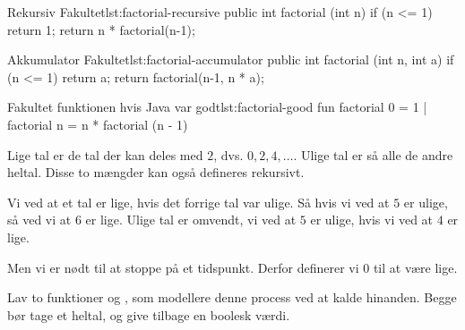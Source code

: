 

	\begin{JavaCode}{Rekursiv Fakultet}{lst:factorial-recursive}
		public int factorial (int n) {
			if (n <= 1)  return 1;
			return n * factorial(n-1);
		}
	\end{JavaCode}

	\begin{JavaCode}{Akkumulator Fakultet}{lst:factorial-accumulator}
		public int factorial (int n, int a) {
			if (n <= 1)  return a;
			return factorial(n-1, n * a);
		}
	\end{JavaCode}

	\begin{JavaCode}{Fakultet funktionen hvis Java var godt}{lst:factorial-good}
		fun factorial 0  =  1
		  | factorial n  =  n * factorial (n - 1)
	\end{JavaCode}

	\begin{exercise}
		Lige tal er de tal der kan deles med \(2\), dvs. \(0, 2, 4, \dots\).
		Ulige tal er så alle de andre heltal. Disse to mængder kan også defineres
		rekursivt.

		Vi ved at et tal er lige, hvis det forrige tal var ulige. Så hvis vi ved
		at \(5\) er ulige, så ved vi at \(6\) er lige. Ulige tal er omvendt, vi
		ved at \(5\) er ulige, hvis vi ved at \(4\) er lige.

		Men vi er nødt til at stoppe på et tidspunkt. Derfor definerer vi
		\(0\) til at være lige.

		Lav to funktioner  og , som modellere
		denne process ved at kalde hinanden. Begge bør tage et heltal, og give
		tilbage en boolesk værdi.


	\end{exercise}


